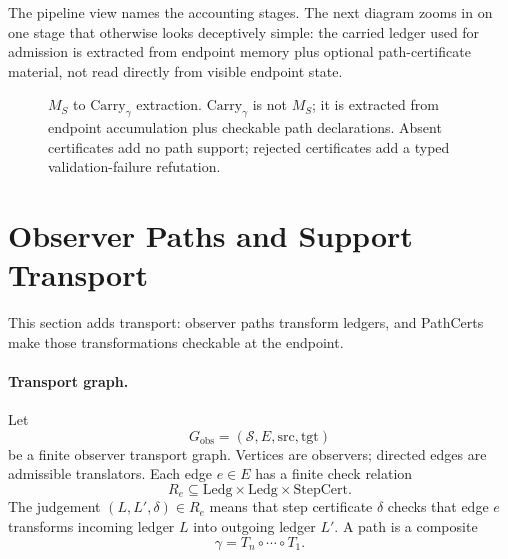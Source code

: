\documentclass[11pt,twoside]{article}
\theoremstyle{definition}
\newcommand{\Carry}{\mathrm{Carry}}
\newcommand{\PathCert}{\mathrm{PathCert}}
\newcommand{\Extract}{\mathrm{Extract}}
\newcommand{\Ledg}{\mathrm{Ledg}}
\newcommand{\ctx}{\mathrm{ctx}}
\begin{document}
The pipeline view names the accounting stages. The next diagram zooms in on one
stage that otherwise looks deceptively simple: the carried ledger used for
admission is extracted from endpoint memory plus optional path-certificate
material, not read directly from visible endpoint state.

\begin{figure}[ht]
\centering
{}
\caption{$M_S$ to $\Carry_\gamma$ extraction. $\Carry_\gamma$ is not $M_S$; it is extracted from endpoint accumulation plus checkable path declarations. Absent certificates add no path support; rejected certificates add a typed validation-failure refutation.}
\label{fig:extract-carry}
\end{figure}
\FloatBarrier

\section{Observer Paths and Support Transport}
\label{sec:paths}

This section adds transport: observer paths transform ledgers, and PathCerts
make those transformations checkable at the endpoint.

\paragraph{Transport graph.}
Let
\[
  G_{\mathrm{obs}}=(\mathcal S,E,\mathrm{src},\mathrm{tgt})
\]
be a finite observer transport graph. Vertices are observers; directed edges are
admissible translators. Each edge $e\in E$ has a finite check relation
\[
  R_e\subseteq \Ledg\times\Ledg\times\mathrm{StepCert}.
\]
The judgement $(L,L',\delta)\in R_e$ means that step certificate $\delta$
checks that edge $e$ transforms incoming ledger $L$ into outgoing ledger $L'$.
A path is a composite
\[
  \gamma=T_n\circ \cdots \circ T_1.
\]
\end{document}
